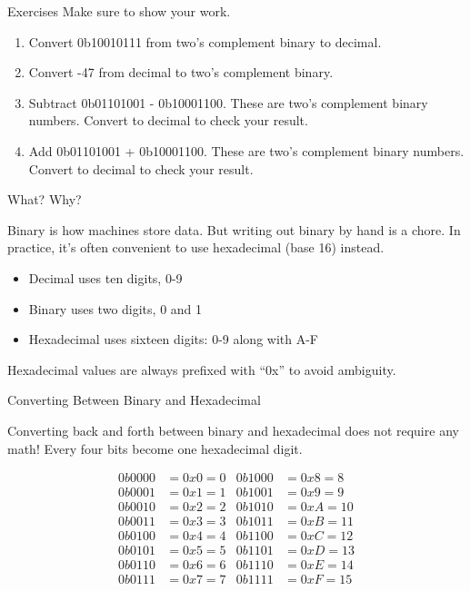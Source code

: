 \begin{frame}{Exercises}
    Make sure to show your work.
    \begin{enumerate}
        \item Convert 0b10010111 from two's complement binary to decimal.
        \item Convert -47 from decimal to two's complement binary.
        \item Subtract 0b01101001 - 0b10001100. These are two's complement binary numbers.
              Convert to decimal to check your result.
        \item Add 0b01101001 + 0b10001100. These are two's complement binary numbers. Convert
              to decimal to check your result.
    \end{enumerate}
\end{frame}


\begin{frame}{What? Why?}

    Binary is how machines store data. But writing out binary by hand is a chore.
    In practice, it's often convenient to use hexadecimal (base 16) instead.

    \begin{itemize}
        \item Decimal uses ten digits, 0-9
        \item Binary uses two digits, 0 and 1
        \item Hexadecimal uses sixteen digits: 0-9 along with A-F
    \end{itemize}
    Hexadecimal values are always prefixed with ``0x'' to avoid ambiguity.
\end{frame}

\begin{frame}{Converting Between Binary and Hexadecimal}

    Converting back and forth between binary and hexadecimal does not require any
    math! Every four bits become one hexadecimal digit.

    \begin{align*}
        0b0000 & = 0x0 = 0 & 0b1000 & = 0x8 = 8  \\
        0b0001 & = 0x1 = 1 & 0b1001 & = 0x9 = 9  \\
        0b0010 & = 0x2 = 2 & 0b1010 & = 0xA = 10 \\
        0b0011 & = 0x3 = 3 & 0b1011 & = 0xB = 11 \\
        0b0100 & = 0x4 = 4 & 0b1100 & = 0xC = 12 \\
        0b0101 & = 0x5 = 5 & 0b1101 & = 0xD = 13 \\
        0b0110 & = 0x6 = 6 & 0b1110 & = 0xE = 14 \\
        0b0111 & = 0x7 = 7 & 0b1111 & = 0xF = 15 \\
    \end{align*}
\end{frame}

